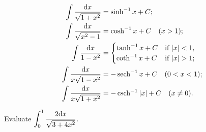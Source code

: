 \begin{theorem}
\begin{align}
\int\frac{\dee x}{\sqrt{1+x^2}} &= \sinh^{-1} x + C;\\
\int\frac{\dee x}{\sqrt{x^2-1}} & = \cosh^{-1} x + C\quad (x>1);\\
\int\frac{\dee x}{1-x^2} 
&=\begin{cases}
\tanh^{-1} x + C& \text{if } |x|<1,\\
\coth^{-1} x + C& \text{if } |x|>1;
\end{cases}\\
\int\frac{\dee x}{x\sqrt{1-x^2}} &= -\sech^{-1} x + C\quad (0<x<1);\\
\int\frac{\dee x}{x\sqrt{1+x^2}} &=-\csch^{-1} |x| + C\quad (x\ne 0).
\end{align}
\end{theorem}

\begin{example}
Evaluate $\displaystyle\int_0^1\frac{2\mathrm{d} x}{\sqrt{3+4x^2}}$.
\end{example}

